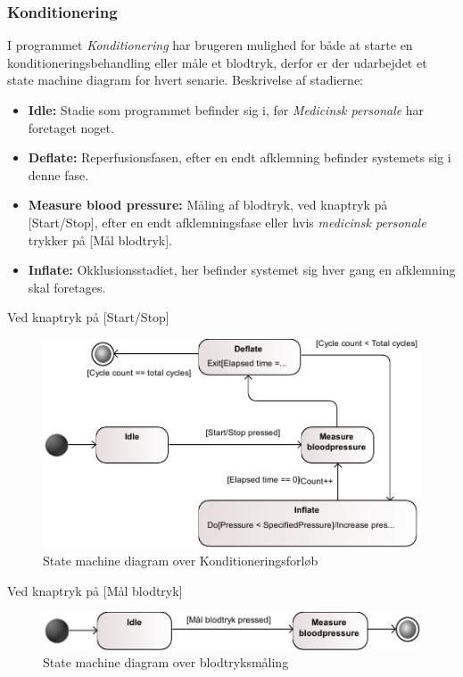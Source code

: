 \subsubsection{Konditionering}
I programmet \textit{Konditionering} har brugeren mulighed for både at starte en konditioneringsbehandling eller måle et blodtryk, derfor er der udarbejdet et state machine diagram for hvert senarie. Beskrivelse af stadierne:
\begin{itemize}
	\item \textbf{Idle:} Stadie som programmet befinder sig i, før \textit{Medicinsk personale} har foretaget noget.
	\item \textbf{Deflate:} Reperfusionsfasen, efter en endt afklemning befinder systemets sig i denne fase.
	\item \textbf{Measure blood pressure:} Måling af blodtryk, ved knaptryk på [Start/Stop], efter en endt afklemningsfase eller hvis \textit{medicinsk personale} trykker på [Mål blodtryk].
	\item \textbf{Inflate:} Okklusionsstadiet, her befinder systemet sig hver gang en afklemning skal foretages.
\end{itemize}
Ved knaptryk på [Start/Stop] \\
\begin{figure}[H]
\includegraphics[width=\textwidth]{SystemArkitektur/pdfs/STM_Konditionering1-crop.pdf}
\caption{State machine diagram over Konditioneringsforløb}
\end{figure}

Ved knaptryk på [Mål blodtryk] \\
\begin{figure}[H]
\includegraphics[width=\textwidth]{SystemArkitektur/pdfs/STM_Konditionering2-crop.pdf}
\caption{State machine diagram over blodtryksmåling}
\end{figure}
\newpage

